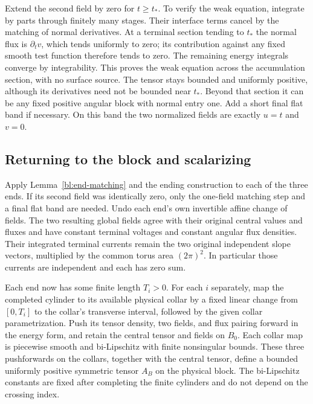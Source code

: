 Extend the second field by zero for $t\ge t_*$.  To verify the weak
equation, integrate by parts through finitely many stages.  Their
interface terms cancel by the matching of normal derivatives.  At
a terminal section tending to $t_*$ the normal flux is
$\partial_t v$, which tends uniformly to zero; its contribution against
any fixed smooth test function therefore tends to zero.  The remaining
energy integrals converge by integrability.  This proves the weak
equation across the accumulation section, with no surface source.
The tensor stays bounded and uniformly positive, although its
derivatives need not be bounded near $t_*$.  Beyond that section it
can be any fixed positive angular block with normal entry one.  Add
a short final flat band if necessary.  On this band the two normalized
fields are exactly $u=t$ and $v=0$.

\subsection{Returning to the block and scalarizing}

Apply Lemma~\ref{bl:end-matching} and the ending construction to each
of the three ends.  If its second field was identically zero, only the one-field matching
step and a final flat band are needed.  Undo each end's own invertible
affine change of fields.  The two resulting global fields agree with
their original central values and fluxes and have constant terminal
voltages and constant angular flux densities.  Their integrated terminal
currents remain the two original independent slope vectors, multiplied
by the common torus area $(2\pi)^2$.  In particular those currents are
independent and each has zero sum.

Each end now has some finite length $T_i>0$.  For each $i$ separately,
map the completed cylinder to its available physical collar by a fixed
linear change from $[0,T_i]$ to the collar's transverse interval,
followed by the given collar parametrization.  Push its tensor density,
two fields, and flux pairing forward in the energy form, and retain the
central tensor and fields on $B_0$.  Each collar map is piecewise smooth
and bi-Lipschitz with finite nonsingular bounds.  These three
pushforwards on the collars, together with the central tensor, define
a bounded uniformly positive symmetric tensor $A_B$ on the physical
block.  The bi-Lipschitz constants are fixed after completing the finite
cylinders and do not depend on the crossing index.

